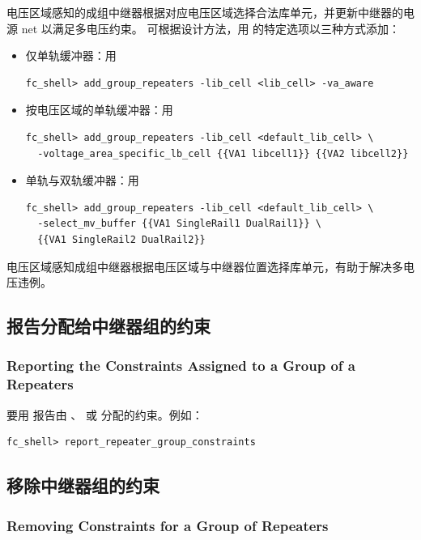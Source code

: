电压区域感知的成组中继器根据对应电压区域选择合法库单元，并更新中继器的电源 net 以满足多电压约束。
可根据设计方法，用  的特定选项以三种方式添加：
\begin{itemize}
  \item 仅单轨缓冲器：用 
\begin{lstlisting}
fc_shell> add_group_repeaters -lib_cell <lib_cell> -va_aware
\end{lstlisting}
  \item 按电压区域的单轨缓冲器：用 
\begin{lstlisting}
fc_shell> add_group_repeaters -lib_cell <default_lib_cell> \
  -voltage_area_specific_lb_cell {{VA1 libcell1}} {{VA2 libcell2}}
\end{lstlisting}
  \item 单轨与双轨缓冲器：用 
\begin{lstlisting}
fc_shell> add_group_repeaters -lib_cell <default_lib_cell> \
  -select_mv_buffer {{VA1 SingleRail1 DualRail1}} \
  {{VA1 SingleRail2 DualRail2}}
\end{lstlisting}
\end{itemize}
电压区域感知成组中继器根据电压区域与中继器位置选择库单元，有助于解决多电压违例。

\subsection{报告分配给中继器组的约束}
\subsubsection*{Reporting the Constraints Assigned to a Group of a Repeaters}

要用  报告由 、 或  分配的约束。例如：
\begin{lstlisting}
fc_shell> report_repeater_group_constraints
\end{lstlisting}

\subsection{移除中继器组的约束}
\subsubsection*{Removing Constraints for a Group of Repeaters}

